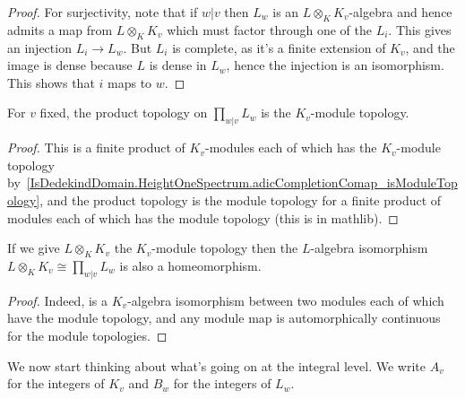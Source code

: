 \begin{proof}
  For surjectivity, note that if $w|v$ then $L_w$ is an $L\otimes_KK_v$-algebra and hence
  admits a map from $L\otimes_K K_v$ which must factor through one of the $L_i$.
  This gives an injection $L_i\to L_w$. But $L_i$ is complete, as it's a finite extension
  of $K_v$, and the image is dense because $L$ is dense in $L_w$, hence the injection
  is an isomorphism. This shows that $i$ maps to $w$.
\end{proof}

\begin{theorem}
  \label{IsDedekindDomain.HeightOneSpectrum.prodAdicCompletionComap_isModuleTopology}
  \leanok
  For $v$ fixed, the product topology on $\prod_{w|v}L_w$ is the $K_v$-module
  topology.
\end{theorem}
\begin{proof}
  \leanok
  This is a finite product of $K_v$-modules each of which has the $K_v$-module topology
  by~\ref{IsDedekindDomain.HeightOneSpectrum.adicCompletionComap_isModuleTopology},
  and the product topology is the module topology for a finite product of modules each of which
  has the module topology (this is in mathlib).
\end{proof}

\begin{theorem}
  \label{IsDedekindDomain.HeightOneSpectrum.adicCompletionComapContinuousAlgEquiv}
  If we give $L\otimes_KK_v$ the $K_v$-module topology then the $L$-algebra isomorphism
  $L\otimes_K K_v\cong\prod_{w|v}L_w$ is also a homeomorphism.
\end{theorem}
\begin{proof} Indeed, is a $K_v$-algebra isomorphism between two modules each of which
  have the module topology, and any module map is automorphically continuous for the
  module topologies.
\end{proof}

We now start thinking about what's going on at the integral level. We write $A_v$
for the integers of $K_v$ and $B_w$ for the integers of $L_w$.

